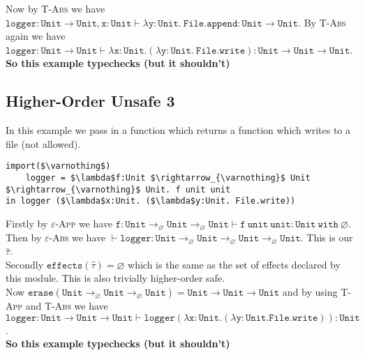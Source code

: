 \documentclass{llncs}
\newcommand{\keywadj}[1]{\mathtt{#1}}
\newcommand{\keyw}[1]{\keywadj{#1}~}
\newcommand{\kw}[1]{\keyw{ #1 }}
\newcommand{\kwa}[1]{\keywadj{ #1 }}
\begin{document}
\noindent
Now by \textsc{T-Abs} we have $\kwa{logger: Unit \rightarrow Unit, x: Unit \vdash \lambda y: Unit.~File.append: Unit \rightarrow Unit}$. By \textsc{T-Abs} again we have $\kwa{logger: Unit \rightarrow Unit \vdash \lambda x:Unit.(\lambda y:Unit.~File.write): Unit \rightarrow Unit \rightarrow Unit}$. \\

\noindent
\textbf{So this example typechecks (but it shouldn't)}

\subsection{Higher-Order Unsafe 3}

In this example we pass in a function which returns a function which writes to a file (not allowed).

\begin{lstlisting}
import($\varnothing$)
    logger = $\lambda$f:Unit $\rightarrow_{\varnothing}$ Unit  $\rightarrow_{\varnothing}$ Unit. f unit unit
in logger ($\lambda$x:Unit. ($\lambda$y:Unit. File.write))
\end{lstlisting}

\noindent
Firstly by \textsc{$\varepsilon$-App} we have $\kwa{f:Unit \rightarrow_{\varnothing} Unit  \rightarrow_{\varnothing} Unit \vdash f~unit~unit: Unit~\kw{with} \varnothing}$. Then by \textsc{$\varepsilon$-Abs} we have $\kwa{\vdash logger: Unit \rightarrow_{\varnothing} Unit \rightarrow_{\varnothing} Unit \rightarrow_{\varnothing} Unit}$. This is our $\hat \tau$.\\

\noindent
Secondly $\kwa{effects}(\hat \tau) = \varnothing$ which is the same as the set of effects declared by this module. This is also trivially higher-order safe. \\

\noindent
Now $\kwa{erase(Unit \rightarrow_{\varnothing} Unit  \rightarrow_{\varnothing} Unit) = Unit \rightarrow Unit \rightarrow Unit}$ and by using \textsc{T-App} and \textsc{T-Abs} we have \\ $\kwa{logger: Unit \rightarrow Unit \rightarrow Unit \vdash logger (\lambda x:Unit. (\lambda y:Unit. File.write)): Unit }$. \\

\noindent
\textbf{So this example typechecks (but it shouldn't)}
\end{document}
